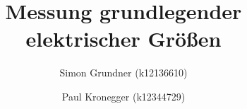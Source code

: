 \documentclass[a4paper,oneside,11pt,ngerman]{scrartcl}
\begin{document}
\title{Messung grundlegender elektrischer Größen}
\author{Simon Grundner (k12136610) \and Paul Kronegger (k12344729)}


\tableofcontents















\end{document}
